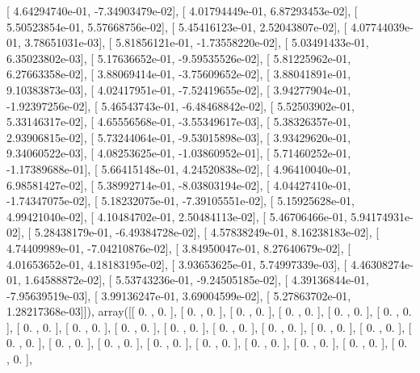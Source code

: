 \documentclass{article}
\begin{document}
       [  4.64294740e-01,  -7.34903479e-02],
       [  4.01794449e-01,   6.87293453e-02],
       [  5.50523854e-01,   5.57668756e-02],
       [  5.45416123e-01,   2.52043807e-02],
       [  4.07744039e-01,   3.78651031e-03],
       [  5.81856121e-01,  -1.73558220e-02],
       [  5.03491433e-01,   6.35023802e-03],
       [  5.17636652e-01,  -9.59535526e-02],
       [  5.81225962e-01,   6.27663358e-02],
       [  3.88069414e-01,  -3.75609652e-02],
       [  3.88041891e-01,   9.10383873e-03],
       [  4.02417951e-01,  -7.52419655e-02],
       [  3.94277904e-01,  -1.92397256e-02],
       [  5.46543743e-01,  -6.48468842e-02],
       [  5.52503902e-01,   5.33146317e-02],
       [  4.65556568e-01,  -3.55349617e-03],
       [  5.38326357e-01,   2.93906815e-02],
       [  5.73244064e-01,  -9.53015898e-03],
       [  3.93429620e-01,   9.34060522e-03],
       [  4.08253625e-01,  -1.03860952e-01],
       [  5.71460252e-01,  -1.17389688e-01],
       [  5.66415148e-01,   4.24520838e-02],
       [  4.96410040e-01,   6.98581427e-02],
       [  5.38992714e-01,  -8.03803194e-02],
       [  4.04427410e-01,  -1.74347075e-02],
       [  5.18232075e-01,  -7.39105551e-02],
       [  5.15925628e-01,   4.99421040e-02],
       [  4.10484702e-01,   2.50484113e-02],
       [  5.46706466e-01,   5.94174931e-02],
       [  5.28438179e-01,  -6.49384728e-02],
       [  4.57838249e-01,   8.16238183e-02],
       [  4.74409989e-01,  -7.04210876e-02],
       [  3.84950047e-01,   8.27640679e-02],
       [  4.01653652e-01,   4.18183195e-02],
       [  3.93653625e-01,   5.74997339e-03],
       [  4.46308274e-01,   1.64588872e-02],
       [  5.53743236e-01,  -9.24505185e-02],
       [  4.39136844e-01,  -7.95639519e-03],
       [  3.99136247e-01,   3.69004599e-02],
       [  5.27863702e-01,   1.28217368e-03]]), array([[ 0.        ,  0.        ],
       [ 0.        ,  0.        ],
       [ 0.        ,  0.        ],
       [ 0.        ,  0.        ],
       [ 0.        ,  0.        ],
       [ 0.        ,  0.        ],
       [ 0.        ,  0.        ],
       [ 0.        ,  0.        ],
       [ 0.        ,  0.        ],
       [ 0.        ,  0.        ],
       [ 0.        ,  0.        ],
       [ 0.        ,  0.        ],
       [ 0.        ,  0.        ],
       [ 0.        ,  0.        ],
       [ 0.        ,  0.        ],
       [ 0.        ,  0.        ],
       [ 0.        ,  0.        ],
       [ 0.        ,  0.        ],
       [ 0.        ,  0.        ],
       [ 0.        ,  0.        ],
       [ 0.        ,  0.        ],
       [ 0.        ,  0.        ],
       [ 0.        ,  0.        ],
\end{document}

